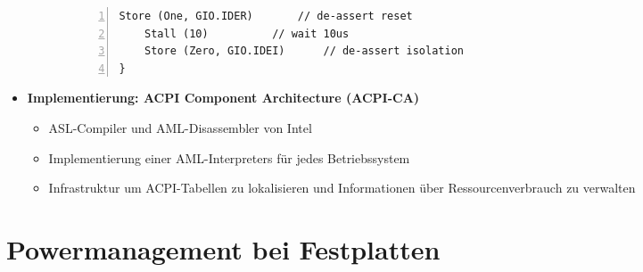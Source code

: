\begin{itemize}
\begin{itemize}
\begin{itemize}
\begin{minipage}{\textwidth}
\begin{lstlisting}[frame=single,numbers=left,mathescape]
	Store (One, GIO.IDER)		// de-assert reset
	Stall (10)			// wait 10us
	Store (Zero, GIO.IDEI)		// de-assert isolation
}
				\end{lstlisting}
				\end{minipage}
		\end{itemize}
	\end{itemize}
	\item \textbf{Implementierung: ACPI Component Architecture (ACPI-CA)}
	\begin{itemize}
		\item ASL-Compiler und AML-Disassembler von Intel
		\item Implementierung einer AML-Interpreters für jedes Betriebssystem
		\item Infrastruktur um ACPI-Tabellen zu lokalisieren und Informationen über Ressourcenverbrauch zu verwalten
	\end{itemize}
\end{itemize}



\section{Powermanagement bei Festplatten}

